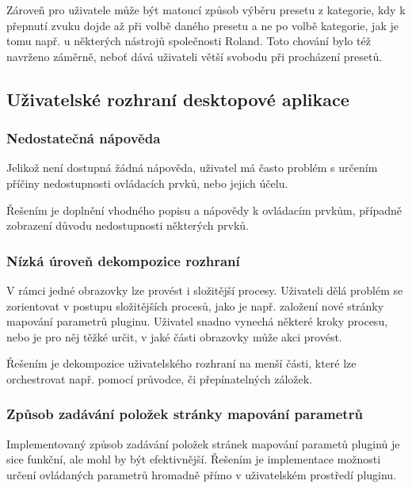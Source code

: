 \documentclass[thesis=M,czech]{FITthesis}[2019/03/06]
\begin{document}
				Zároveň pro uživatele může být matoucí způsob výběru presetu z kategorie, kdy k přepnutí zvuku dojde až při volbě daného presetu a ne po volbě kategorie, jak je tomu např. u některých nástrojů společnosti Roland. Toto chování bylo též navrženo záměrně, neboť dává uživateli větší svobodu při procházení presetů.
			
		\subsection{Uživatelské rozhraní desktopové aplikace}
			\subsubsection{Nedostatečná nápověda}
				Jelikož není dostupná žádná nápověda, uživatel má často problém s určením příčiny nedostupnosti ovládacích prvků, nebo jejich účelu.
				
				Řešením je doplnění vhodného popisu a nápovědy k ovládacím prvkům, případně zobrazení důvodu nedostupnosti některých prvků.
			
			\subsubsection{Nízká úroveň dekompozice rozhraní}
				V rámci jedné obrazovky lze provést i složitější procesy. Uživateli dělá problém se zorientovat v postupu složitějších procesů, jako je např. založení nové stránky mapování parametrů pluginu. Uživatel snadno vynechá některé kroky procesu, nebo je pro něj těžké určit, v jaké části obrazovky může akci provést.
				
				Řešením je dekompozice uživatelského rozhraní na menší části, které lze orchestrovat např. pomocí průvodce, či přepínatelných záložek.

			\subsubsection{Způsob zadávání položek stránky mapování parametrů}
				Implementovaný způsob zadávání položek stránek mapování parametů pluginů je sice funkční, ale mohl by být efektivnější. 
				Řešením je implementace možnosti určení ovládaných parametrů hromadně přímo v uživatelském prostředí pluginu.
\end{document}
